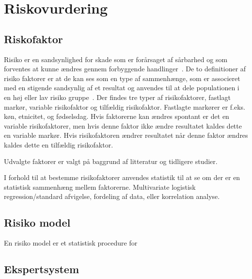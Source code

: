 \chapter{Riskovurdering}

\section{Riskofaktor}
Risiko er en sandsynlighed for skade som er forårsaget af sårbarhed og som forventes at kunne ændres gennem forbyggende handlinger~\citep{Alam2016}. De to definitioner af risiko faktorer er at de kan ses som en type af sammenhænge, som er associeret med en stigende sandsynlig af et resultat og anvendes til at dele populationen i en høj eller lav risiko gruppe~\citep{Offord2000}. Der findes tre typer af risikofaktorer, fastlagt markør, variable risikofaktor og tilfældig risikofaktor. Fastlagte markører er f.eks. køn, etnicitet, og fødselsdag. Hvis faktorerne kan ændres spontant er det en variable risikofaktorer, men hvis denne faktor ikke ændre resultatet kaldes dette en variable markør. Hvis risikofaktoren ændrer resultatet når denne faktor ændres kaldes dette en tilfældig risikofaktor.~\citep{Offord2000}

Udvalgte faktorer er valgt på baggrund af litteratur og tidligere studier.

I forhold til at bestemme risikofaktorer anvendes statistik til at se om der er en statistisk sammenhæng mellem faktorerne. Multivariate logistisk regression/standard afvigelse, fordeling af data, eller korrelation analyse. 



\section{Risiko model}
En risiko model er et statistisk procedure for 

\section{Ekspertsystem}